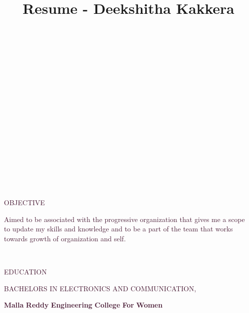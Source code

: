 \documentclass[12pt]{article}
\title{Resume - Deekshitha Kakkera}
\author{}
\date{}
\begin{document}
\maketitle
\noindent
\\
\\
\\
\\
\\
\\
\\
\\
\\
\\
\\
\\
\\
\\
\\
\begin{flushleft}
\textcolor[HTML]{481A34}{OBJECTIVE}
\end{flushleft}
\begin{justify}
\textcolor[HTML]{481A34}{Aimed to be associated } \textcolor[HTML]{481A34}{with the progressive} \textcolor[HTML]{481A34}{ } \textcolor[HTML]{481A34}{organization that gives me a scope to update my} \textcolor[HTML]{481A34}{ } \textcolor[HTML]{481A34}{skills and knowledge and to be a part of the} \textcolor[HTML]{481A34}{ } \textcolor[HTML]{481A34}{team} \textcolor[HTML]{481A34}{ } \textcolor[HTML]{481A34}{that} \textcolor[HTML]{481A34}{ } \textcolor[HTML]{481A34}{works} \textcolor[HTML]{481A34}{ } \textcolor[HTML]{481A34}{towards} \textcolor[HTML]{481A34}{ } \textcolor[HTML]{481A34}{growth} \textcolor[HTML]{481A34}{ } \textcolor[HTML]{481A34}{of} \textcolor[HTML]{481A34}{ } \textcolor[HTML]{481A34}{organization} \textcolor[HTML]{481A34}{ } \textcolor[HTML]{481A34}{and} \textcolor[HTML]{481A34}{ } \textcolor[HTML]{481A34}{self.}
\end{justify}
\\
\begin{flushleft}
\textcolor[HTML]{481A34}{EDUCATION}
\end{flushleft}
\begin{justify}
\textcolor[HTML]{481A34}{BACHELORS} \textcolor[HTML]{481A34}{ } \textcolor[HTML]{481A34}{IN} \textcolor[HTML]{481A34}{ } \textcolor[HTML]{481A34}{ELECTRONICS} \textcolor[HTML]{481A34}{ } \textcolor[HTML]{481A34}{AND} \textcolor[HTML]{481A34}{ } \textcolor[HTML]{481A34}{COMMUNICATION,}
\end{justify}
\begin{justify}
\textcolor[HTML]{481A34}{\textbf{Malla}} \textcolor[HTML]{481A34}{\textbf{ }} \textcolor[HTML]{481A34}{\textbf{Reddy}} \textcolor[HTML]{481A34}{\textbf{ }} \textcolor[HTML]{481A34}{\textbf{Engineering}} \textcolor[HTML]{481A34}{\textbf{ }} \textcolor[HTML]{481A34}{\textbf{College}} \textcolor[HTML]{481A34}{\textbf{ }} \textcolor[HTML]{481A34}{\textbf{For}} \textcolor[HTML]{481A34}{\textbf{ }} \textcolor[HTML]{481A34}{\textbf{Women}}
\end{justify}
\end{document}
